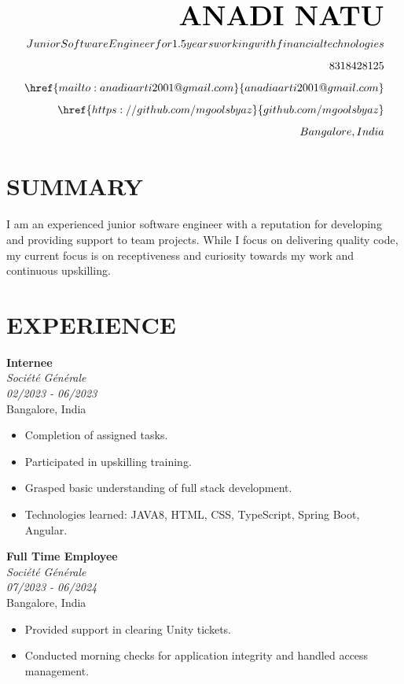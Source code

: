 \documentclass[a4paper,10pt]{article}
\begin{document}
\begin{align}
    
    \textbf{\Huge ANADI NATU} \\[0.5em]
    Junior Software Engineer for 1.5 years working with financial technologies \\[0.5em]
    8318428125 \\[0.5em]
    \href{mailto:anadiaarti2001@gmail.com}{anadiaarti2001@gmail.com} \\[0.5em]
    \href{https://github.com/mgoolsbyaz}{github.com/mgoolsbyaz} \\[0.5em]
    Bangalore, India
\end{align}

\vspace{1em}

\begin{multicols}{2}

\section*{SUMMARY}
I am an experienced junior software engineer with a reputation for developing and providing support to team projects. While I focus on delivering quality code, my current focus is on receptiveness and curiosity towards my work and continuous upskilling.

\section*{EXPERIENCE}
\textbf{Internee} \\
\textit{Société Générale} \\
\textit{02/2023 - 06/2023} \\
Bangalore, India
\begin{itemize}[leftmargin=*]
    \item Completion of assigned tasks.
    \item Participated in upskilling training.
    \item Grasped basic understanding of full stack development.
    \item Technologies learned: JAVA8, HTML, CSS, TypeScript, Spring Boot, Angular.
\end{itemize}
\textbf{Full Time Employee} \\
\textit{Société Générale} \\
\textit{07/2023 - 06/2024} \\
Bangalore, India
\begin{itemize}[leftmargin=*]
    \item Provided support in clearing Unity tickets.
    \item Conducted morning checks for application integrity and handled access management.
\end{itemize}


\end{multicols}
\end{document}
